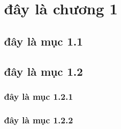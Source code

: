 \chapter{đây là chương 1}
\label{chap:quydinh}


\section{đây là mục 1.1}
\lipsum
\section{đây là mục 1.2}
\lipsum
\subsection{đây là mục 1.2.1}
\lipsum
\subsection{đây là mục 1.2.2}
\lipsum

